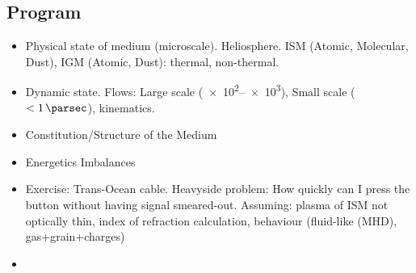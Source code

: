 \documentclass[10pt,xcolor={usenames},fleqn,mathserif,serif]{beamer}
\begin{document}
\subsection{Program}

\begin{itemize}
    \item Physical state of medium (microscale). Heliosphere. ISM (Atomic, Molecular, Dust), IGM (Atomic, Dust): thermal, non-thermal.
    \item Dynamic state. Flows: Large scale (\SIrange{e2}{e3}{\parsec}), Small scale ($<\SI{1}{\parsec}$), kinematics.
    \item Constitution/Structure of the Medium
    \item Energetics Imbalances
\end{itemize}

\begin{itemize}
    \item Exercise: Trans-Ocean cable. Heavyside problem: How quickly can I press the button without having signal smeared-out.
    Assuming: plasma of ISM not optically thin, index of refraction calculation, behaviour (fluid-like (MHD), gas+grain+charges)
    \item 
\end{itemize}
\end{document}
